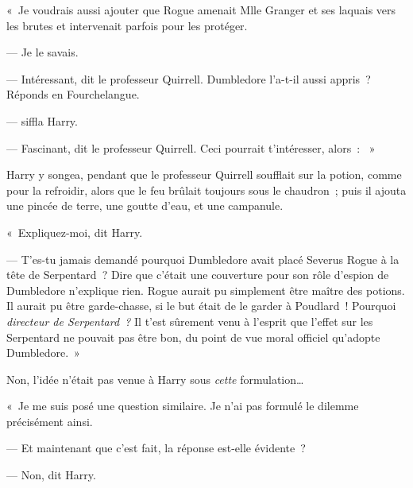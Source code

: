 «~Je voudrais aussi ajouter que Rogue amenait Mlle Granger et ses laquais vers les brutes et intervenait parfois pour les protéger.

--- Je le savais.

--- Intéressant, dit le professeur Quirrell. Dumbledore l'a-t-il aussi appris~? Réponds en Fourchelangue.

---  siffla Harry.

--- Fascinant, dit le professeur Quirrell. Ceci pourrait t'intéresser, alors~: ~»

Harry y songea, pendant que le professeur Quirrell soufflait sur la potion, comme pour la refroidir, alors que le feu brûlait toujours sous le chaudron~; puis il ajouta une pincée de terre, une goutte d'eau, et une campanule.

«~Expliquez-moi, dit Harry.

--- T'es-tu jamais demandé pourquoi Dumbledore avait placé Severus Rogue à la tête de Serpentard~? Dire que c'était une couverture pour son rôle d'espion de Dumbledore n'explique rien. Rogue aurait pu simplement être maître des potions. Il aurait pu être garde-chasse, si le but était de le garder à Poudlard~! Pourquoi \emph{directeur de Serpentard~?} Il t'est sûrement venu à l'esprit que l'effet sur les Serpentard ne pouvait pas être bon, du point de vue moral officiel qu'adopte Dumbledore.~»

Non, l'idée n'était pas venue à Harry sous \emph{cette} formulation…

«~Je me suis posé une question similaire. Je n'ai pas formulé le dilemme précisément ainsi.

--- Et maintenant que c'est fait, la réponse est-elle évidente~?

--- Non, dit Harry.

